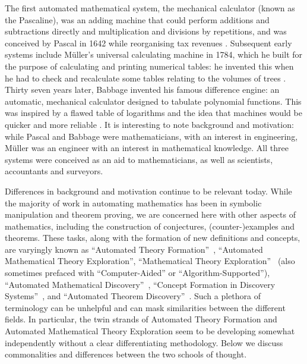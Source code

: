 The first automated mathematical system, the mechanical calculator
(known as the Pascaline), was an adding machine that could perform
additions and subtractions directly and multiplication and divisions
by repetitions, and was conceived by Pascal in 1642 while reorganising
tax revenues \cite{d'ocagne}. Subsequent early systems include
M\"uller's universal calculating machine in 1784, which he built for
the purpose of calculating and printing numerical tables: he invented
this when he had to check and recalculate some tables relating to the
volumes of trees \cite[p. 65]{lindgren}. Thirty seven years later,
Babbage invented his famous difference engine: an automatic,
mechanical calculator designed to tabulate polynomial functions. This
was inspired by a flawed table of logarithms and the idea that
machines would be quicker and more reliable \cite{bowden}. It is
interesting to note background and motivation: while Pascal and
Babbage were mathematicians, with an interest in engineering, M\"uller
was an engineer with an interest in mathematical knowledge. All three
systems were conceived as an aid to mathematicians, as well as
scientists, accountants and surveyors.

Differences in background and motivation continue to be relevant
today. While the majority of work in automating mathematics has been
in symbolic manipulation and theorem proving, we are concerned here
with other aspects of mathematics, including the construction of conjectures,
(counter-)examples and theorems. These tasks, along with the formation of new
definitions and concepts, are varyingly known as
``Automated Theory Formation''~\cite{lenat:77,colton:book},
``Automated Mathematical Theory Exploration'',
``Mathematical Theory Exploration''~\cite{buchberger:06} (also sometimes
prefaced with ``Computer-Aided'' or ``Algorithm-Supported''),
``Automated Mathematical Discovery''~\cite{epstein:91,colton:interestingness,esarm2008},
``Concept Formation in Discovery Systems''~\cite{haase}, and
``Automated Theorem Discovery''~\cite{roy}. Such a plethora of terminology can
be unhelpful and can mask similarities between the different fields. In
particular, the twin strands of Automated Theory Formation and
Automated Mathematical Theory Exploration seem to be developing
somewhat independently without a clear differentiating
methodology. Below we discuss commonalities and differences between
the two schools of thought.



